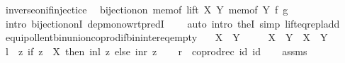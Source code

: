 \begin{isabellebody}
\ inverse{\isacharunderscore}{\kern0pt}on{\isacharunderscore}{\kern0pt}if{\isacharunderscore}{\kern0pt}injectice\ \isamarkupfalse%
\ {\isachardoublequoteopen}bijection{\isacharunderscore}{\kern0pt}on\ {\isacharparenleft}{\kern0pt}mem{\isacharunderscore}{\kern0pt}of\ {\isacharparenleft}{\kern0pt}lift\ X\ Y{\isacharparenright}{\kern0pt}{\isacharparenright}{\kern0pt}\ {\isacharparenleft}{\kern0pt}mem{\isacharunderscore}{\kern0pt}of\ Y{\isacharparenright}{\kern0pt}\ {\isacharquery}{\kern0pt}f\ {\isacharquery}{\kern0pt}g{\isachardoublequoteclose}\isanewline
\ \ \ \ \isamarkupfalse%
\ {\isacharparenleft}{\kern0pt}intro\ bijection{\isacharunderscore}{\kern0pt}onI\ dep{\isacharunderscore}{\kern0pt}mono{\isacharunderscore}{\kern0pt}wrt{\isacharunderscore}{\kern0pt}predI{\isacharparenright}{\kern0pt}\isanewline
\ \ \ \ {\isacharparenleft}{\kern0pt}auto\ intro{\isacharcolon}{\kern0pt}\ the{}I{}\ simp{\isacharcolon}{\kern0pt}\ lift{\isacharunderscore}{\kern0pt}eq{\isacharunderscore}{\kern0pt}repl{\isacharunderscore}{\kern0pt}add{\isacharparenright}{\kern0pt}\isanewline
{}\isamarkupfalse%
%
\endisatagproof
{\isafoldproof}%
%
\isadelimproof
\isanewline
%
\endisadelimproof
\isanewline
{}\isamarkupfalse%
\ equipollent{\isacharunderscore}{\kern0pt}bin{\isacharunderscore}{\kern0pt}union{\isacharunderscore}{\kern0pt}coprod{\isacharunderscore}{\kern0pt}if{\isacharunderscore}{\kern0pt}bin{\isacharunderscore}{\kern0pt}inter{\isacharunderscore}{\kern0pt}eq{\isacharunderscore}{\kern0pt}empty{\isacharcolon}{\kern0pt}\isanewline
\ \ \ {\isachardoublequoteopen}X\ {\isasyminter}\ Y\ {\isacharequal}{\kern0pt}\ {\isacharbraceleft}{\kern0pt}{\isacharbraceright}{\kern0pt}{\isachardoublequoteclose}\isanewline
\ \ \ {\isachardoublequoteopen}X\ {\isasymunion}\ Y\ {\isasymapprox}\ X\ {\isasymCoprod}\ Y{\isachardoublequoteclose}\isanewline
%
\isadelimproof
%
\endisadelimproof
%
\isatagproof
{}\isamarkupfalse%
\ {\isacharminus}{\kern0pt}\isanewline
\ \ \isamarkupfalse%
\ {\isacharquery}{\kern0pt}l\ {\isacharequal}{\kern0pt}\ {\isachardoublequoteopen}{\isasymlambda}z{\isachardot}{\kern0pt}\ if\ z\ {\isasymin}\ X\ then\ inl\ z\ else\ inr\ z{\isachardoublequoteclose}\isanewline
\ \ \isamarkupfalse%
\ {\isacharquery}{\kern0pt}r\ {\isacharequal}{\kern0pt}\ {\isachardoublequoteopen}coprod{\isacharunderscore}{\kern0pt}rec\ id\ id{\isachardoublequoteclose}\isanewline
\ \ \isamarkupfalse%
\ assms\ \isamarkupfalse%

\end{isabellebody}
